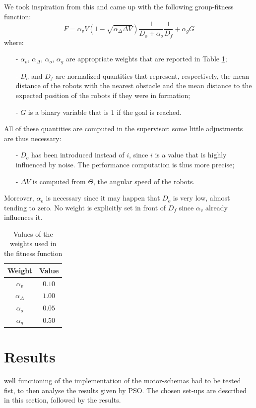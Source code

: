 \documentclass[journal]{IEEEtran}
\begin{document}
We took inspiration from this  and came up with the following group-fitness function: 
\begin {equation}
F=\alpha_vV(1-\sqrt{\alpha_{\Delta}\Delta V})\frac{1}{D_o+\alpha_o}\frac{1}{D_f}+\alpha_gG
\end{equation}
where:
\begin{itemize}
\item[-] $\alpha_v$, $\alpha_\Delta$, $\alpha_o$, $\alpha_g$ are appropriate weights that are reported in Table \ref{weights_fitfct};
\item[-] $D_o$ and $D_f$ are normalized quantities that represent, respectively, the mean distance of the robots with the nearest obstacle and the mean distance to the expected position of the robots if they were in formation; 
\item[-] $G$ is a binary variable that is $1$ if the goal is reached.
\end{itemize} 
All of these quantities are computed in the supervisor: some little adjustments are thus necessary: 
\begin{itemize}
\item[-] $D_o$ has been introduced instead of $i$, since $i$ is a value that is highly influenced by noise. The performance computation is thus more precise;
\item[-] $\Delta V$ is computed from $\Theta$, the angular speed of the robots.
\end{itemize}
Moreover, $\alpha_o$ is necessary since it may happen that $D_o$ is very low, almost tending to zero. No weight is explicitly set in front of $D_f$ since $\alpha_v$ already influences it.
\begin{table}
\begin{center}
\begin{tabular}{|c|c|}
  \hline
  Weight & Value\\
  \hline
  $\alpha_v$      & $0.10$ \\
  $\alpha_\Delta$ & $1.00$ \\
  $\alpha_o$      & $0.05$ \\
  $\alpha_g$      & $0.50$ \\
  \hline
\end{tabular}
\caption{Values of the weights used in the fitness function} \label{weights_fitfct}
\end{center} 
\end{table}

\section{Results}
\label{sec:4}
 well functioning of the implementation of the motor-schemas had to be tested fist, to then analyse the results given by PSO. The chosen set-ups are described in this section, followed by the results. 
\end{document}
